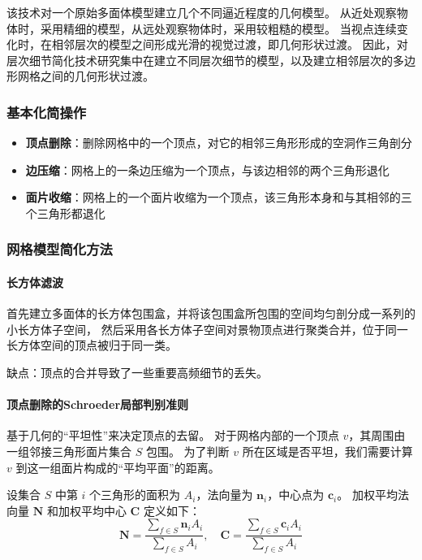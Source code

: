 \documentclass[12pt]{article}
\begin{document}
该技术对一个原始多面体模型建立几个不同逼近程度的几何模型。
从近处观察物体时，采用精细的模型，从远处观察物体时，采用较粗糙的模型。
当视点连续变化时，在相邻层次的模型之间形成光滑的视觉过渡，即几何形状过渡。
因此，对层次细节简化技术研究集中在建立不同层次细节的模型，以及建立相邻层次的多边形网格之间的几何形状过渡。

\subsubsection{基本化简操作}
\begin{itemize}
    \item \textbf{顶点删除}：删除网格中的一个顶点，对它的相邻三角形形成的空洞作三角剖分
    \item \textbf{边压缩}：网格上的一条边压缩为一个顶点，与该边相邻的两个三角形退化
    \item \textbf{面片收缩}：网格上的一个面片收缩为一个顶点，该三角形本身和与其相邻的三个三角形都退化
\end{itemize}

\subsubsection{网格模型简化方法}
\paragraph{长方体滤波}
首先建立多面体的长方体包围盒，并将该包围盒所包围的空间均匀剖分成一系列的小长方体子空间，
然后采用各长方体子空间对景物顶点进行聚类合并，位于同一长方体空间的顶点被归于同一类。

缺点：顶点的合并导致了一些重要高频细节的丢失。

\paragraph{顶点删除的Schroeder局部判别准则}
基于几何的“平坦性”来决定顶点的去留。
对于网格内部的一个顶点 $v$，其周围由一组邻接三角形面片集合 $S$ 包围。
为了判断 $v$ 所在区域是否平坦，我们需要计算 $v$ 到这一组面片构成的“平均平面”的距离。

设集合 $S$ 中第 $i$ 个三角形的面积为 $A_i$，法向量为 $\mathbf{n}_i$，中心点为 $\mathbf{c}_i$。
加权平均法向量 $\mathbf{N}$ 和加权平均中心 $\mathbf{C}$ 定义如下：
\begin{equation}
\mathbf{N} = \frac{\sum_{f \in S} \mathbf{n}_i A_i}{\sum_{f \in S} A_i}, \quad 
\mathbf{C} = \frac{\sum_{f \in S} \mathbf{c}_i A_i}{\sum_{f \in S} A_i}
\end{equation}
\end{document}
